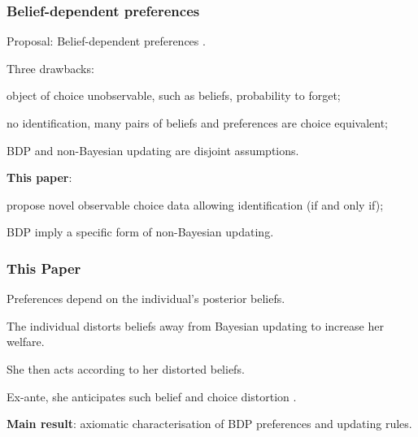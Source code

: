 \documentclass[usenames,dvipsnames,aspectratio=169,11pt, envcountsect, handout]{beamer}
\begin{document}
\begin{frame}\frametitle{Belief-dependent preferences}

	Proposal: Belief-dependent preferences \citep{benabou2016mindful,koszegiUtilityAnticipationPersonal2010}.

	\vfill

	Three drawbacks:

	\vfill

	\begin{wideitemize}
		\item object of choice unobservable, such as beliefs, probability to forget;
		\item no identification, many pairs of beliefs and preferences are choice equivalent;
		\item BDP and non-Bayesian updating are disjoint assumptions.
	\end{wideitemize}

	\vfill \pause

	\textbf{This paper}:
	\vfill
	\begin{wideitemize}
		\item propose novel observable choice data allowing identification (if and only if);
		\item BDP imply a specific form of non-Bayesian updating.
	\end{wideitemize}

\end{frame}

\begin{frame}\frametitle{This Paper}

	Preferences depend on the individual's posterior beliefs.

	\vfill

	The individual distorts beliefs away from Bayesian updating to increase her welfare.

	\vfill

	She then acts according to her distorted beliefs.

	\vfill

	Ex-ante, she anticipates such belief and choice distortion \citep{cobb-clarkPredictivePowerSelfcontrol2022}.

	\vfill \pause

	\textbf{Main result}: axiomatic characterisation of BDP preferences and updating rules.

\end{frame}
\end{document}
